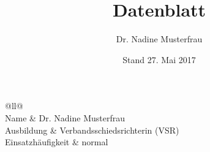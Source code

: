 \documentclass[english, ngerman]{scrartcl}
\title{Datenblatt}
\subtitle{Dr. Nadine Musterfrau}
\date{Stand 27. Mai 2017}
\begin{document}
	\maketitle

	{
		\footnotesize
		\sffamily
		\begin{longtabu}[l]{@{}ll@{}}
			\toprule
			\\
			\midrule
			Name & Dr. Nadine Musterfrau\\
			Ausbildung & Verbandsschiedsrichterin (VSR)\\
			Einsatzhäufigkeit & normal\\
			\bottomrule
		\end{longtabu}
	}
	
\end{document}

